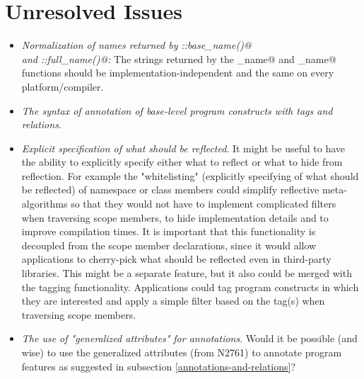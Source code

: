 \section{Unresolved Issues}

\begin{itemize}
	\item {\em Normalization of names returned by \verb@Named::base_name()@\\and \verb@Named::full_name()@:}
	The strings returned by the \verb@base_name@ and \verb@full_name@ functions should be
	implementation-independent and the same on every platform/compiler.

	\item {\em The syntax of annotation of base-level program constructs with tags and relations}.

	\item {\em Explicit specification of what should be reflected}. It might be useful to have
	the ability to explicitly specify either what to reflect or what to hide from reflection.
	For example the "whitelisting" (explicitly specifying of what should be reflected) of namespace
	or class members could simplify reflective meta-algorithms so that they would not have
	to implement complicated filters when traversing scope members, to hide implementation details and
	to improve compilation times. It is important that this functionality is decoupled from the
	scope member declarations, since it would allow applications to cherry-pick what should be
	reflected even in third-party libraries.
	This might be a separate feature, but it also could be merged with the tagging functionality.
	Applications could tag program constructs in which they are interested and apply a simple
	filter based on the tag(s) when traversing scope members.

	\item {\em The use of "generalized attributes" for annotations}. Would it be possible
	(and wise) to use the generalized attributes (from N2761) to annotate program features
	as suggested in subsection \ref{annotations-and-relations}?
\end{itemize}
